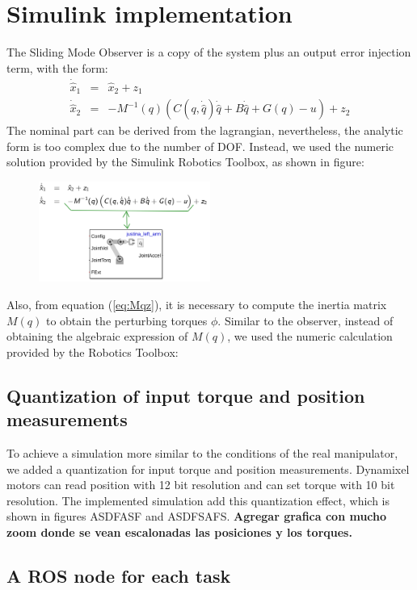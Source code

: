 \documentclass[a4paper, 10pt]{article}
\begin{document}
\section{Simulink implementation}
The Sliding Mode Observer is a copy of the system plus an output error injection term, with the form:
  \begin{eqnarray}
    \dot{\hat{x}}_1 &=& \hat{x}_2 + z_1\label{eq:observer1}\\
    \dot{\hat{x}}_2 &=& -M^{-1}(q)\left(C(q, \dot{\hat{q}})\dot{\hat{q}} + B\dot{\hat{q}} + G(q) - u\right) + z_2\label{eq:observer2}
  \end{eqnarray}
  The nominal part can be derived from the lagrangian, nevertheless, the analytic form is too complex due to the number of DOF. Instead, we used the numeric solution provided by the Simulink Robotics Toolbox, as shown in figure:
  \begin{figure}
    \centering
    \includegraphics[width=0.5\textwidth]{Figures/SMOwithSimulink.png}
  \end{figure}

  Also, from equation (\ref{eq:Mqz}), it is necessary to compute the inertia matrix $M(q)$ to obtain the perturbing torques $\phi$. Similar to the observer, instead of obtaining the algebraic expression of $M(q)$, we used the numeric calculation provided by the Robotics Toolbox:

\subsection{Quantization of input torque and position measurements}
To achieve a simulation more similar to the conditions of the real manipulator, we added a quantization for input torque and position measurements. Dynamixel motors can read position with 12 bit resolution and can set torque with 10 bit resolution. The implemented simulation add this quantization effect, which is shown in figures ASDFASF and ASDFSAFS. 
\textbf{Agregar grafica con mucho zoom donde se vean escalonadas las posiciones y los torques. }

\subsection{A ROS node for each task}
\end{document}
